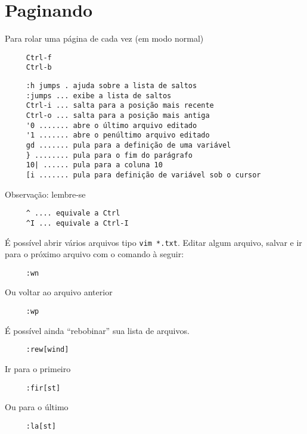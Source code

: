 \section{Paginando}
\label{Paginando}

Para rolar uma página de cada vez (em modo normal)

\begin{verbatim}
     Ctrl-f
     Ctrl-b
\end{verbatim}


\begin{verbatim}
     :h jumps . ajuda sobre a lista de saltos
     :jumps ... exibe a lista de saltos
     Ctrl-i ... salta para a posição mais recente
     Ctrl-o ... salta para a posição mais antiga
     '0 ....... abre o último arquivo editado
     '1 ....... abre o penúltimo arquivo editado
     gd ....... pula para a definição de uma variável
     } ........ pula para o fim do parágrafo
     10| ...... pula para a coluna 10
     [i ....... pula para definição de variável sob o cursor
\end{verbatim}

Observação: lembre-se

\begin{verbatim}
     ^ .... equivale a Ctrl
     ^I ... equivale a Ctrl-I
\end{verbatim}

É possível abrir vários arquivos tipo \verb|vim *.txt|. Editar
algum arquivo, salvar e ir para o próximo arquivo com o comando à
seguir:

\begin{verbatim}
     :wn
\end{verbatim}

Ou voltar ao arquivo anterior

\begin{verbatim}
     :wp
\end{verbatim}

É possível ainda ``rebobinar'' sua lista de arquivos.

\begin{verbatim}
     :rew[wind]
\end{verbatim}

Ir para o primeiro

\begin{verbatim}
     :fir[st]
\end{verbatim}

Ou para o último

\begin{verbatim}
     :la[st]
\end{verbatim}

